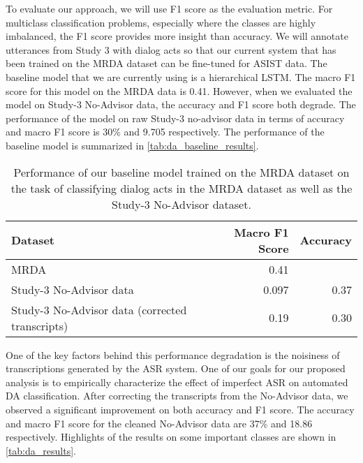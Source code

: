 To evaluate our approach, we will use F1 score as the evaluation metric. For
multiclass classification problems, especially where the classes are highly
imbalanced, the F1 score provides more insight than accuracy. We will annotate
utterances from Study 3 with dialog acts so that our current system that has
been trained on the MRDA dataset can be fine-tuned for ASIST data. The baseline
model that we are currently using is a hierarchical LSTM. The macro F1 score
for this model on the MRDA data is 0.41. However, when we evaluated the model
on Study-3 No-Advisor data, the accuracy and F1 score both degrade. The performance
of the model on raw Study-3 no-advisor data in terms of accuracy and
macro F1 score is 30\% and 9.705 respectively. The performance of the baseline
model is summarized in \autoref{tab:da_baseline_results}.

\begin{table}
    \begin{tabular}{lrr}
        \toprule
        Dataset                                         & Macro F1 Score & Accuracy \\\midrule
        MRDA                                            & 0.41           & \\
        Study-3 No-Advisor data                         & 0.097          & 0.37 \\
        Study-3 No-Advisor data (corrected transcripts) & 0.19           & 0.30 \\
        \bottomrule
    \end{tabular}
    \caption{%
        Performance of our baseline model trained on the MRDA dataset on the
        task of classifying dialog acts in the MRDA dataset as well as the
        Study-3 No-Advisor dataset.
    }
    \label{tab:da_baseline_results}
\end{table}

One of the key factors behind this performance degradation is the noisiness of
transcriptions generated by the ASR system. One of our goals for our proposed
analysis is to empirically characterize the effect of imperfect ASR on
automated DA classification.  After correcting the transcripts from the
No-Advisor data, we observed a significant improvement on both accuracy and F1
score. The accuracy and macro F1 score for the cleaned No-Advisor data are 37\%
and 18.86 respectively. Highlights of the results on some important classes are
shown in \autoref{tab:da_results}.


